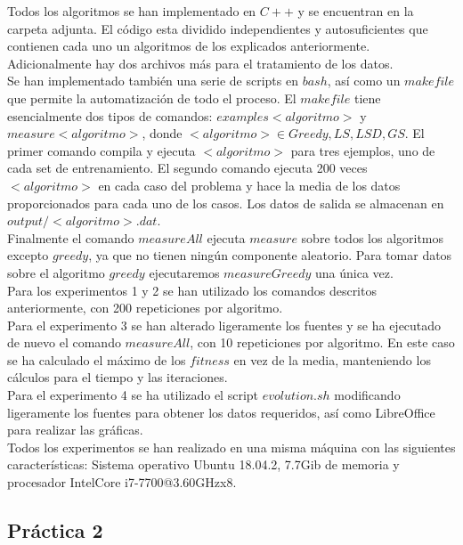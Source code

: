 \documentclass[11pt,a4paper]{article}
\begin{document}
	Todos los algoritmos se han implementado en $C++$ y se encuentran en la carpeta adjunta. El código esta dividido independientes y autosuficientes que contienen cada uno un algoritmos de los explicados anteriormente. Adicionalmente hay dos archivos más para el tratamiento de los datos. \\
	
	Se han implementado también una serie de scripts en $bash$, así como un $makefile$ que permite la automatización de todo el proceso. El $makefile$ tiene esencialmente dos tipos de comandos: $examples<algoritmo>$ y $measure<algoritmo>$, donde $<algoritmo> \in {Greedy, LS, LSD, GS}$. El primer comando compila y ejecuta $<algoritmo>$ para tres ejemplos, uno de cada set de entrenamiento. El segundo comando ejecuta 200 veces $<algoritmo>$ en cada caso del problema y hace la media de los datos proporcionados para cada uno de los casos. Los datos de salida se almacenan en $output/<algoritmo>.dat$. \\
	
	Finalmente el comando $measureAll$ ejecuta $measure$ sobre todos los algoritmos excepto $greedy$, ya que no tienen ningún componente aleatorio. Para tomar datos sobre el algoritmo $greedy$ ejecutaremos $measureGreedy$ una única vez. \\
	
	Para los experimentos 1 y 2 se han utilizado los comandos descritos anteriormente, con 200 repeticiones por algoritmo. \\
	
	Para el experimento 3 se han alterado ligeramente los fuentes y se ha ejecutado de nuevo el comando $measureAll$, con 10 repeticiones por algoritmo. En este caso se ha calculado el máximo de los $fitness$ en vez de la media, manteniendo los cálculos para el tiempo y las iteraciones. \\
	
	Para el experimento 4 se ha utilizado el script $evolution.sh$ modificando ligeramente los fuentes para obtener los datos requeridos, así como LibreOffice para realizar las gráficas. \\
	
	Todos los experimentos se han realizado en una misma máquina con las siguientes características: Sistema operativo Ubuntu 18.04.2, 7.7Gib de memoria y procesador IntelCore i7-7700@3.60GHzx8.
	

	\subsection{ Práctica 2 } \label{procedimiento2}
	
\end{document}
